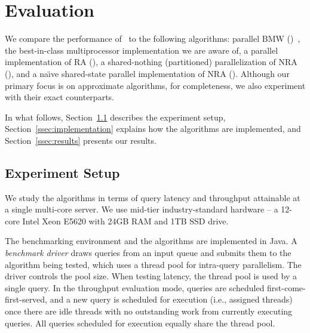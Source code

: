 \section{Evaluation} \label{sec:eval}

We compare the performance of \alg\ to the following algorithms: parallel BMW (\pBMW)~\cite{rojas2013efficient}, 
the best-in-class multiprocessor implementation we are aware of, a parallel implementation of RA (\pRA),  a shared-nothing (partitioned) parallelization of NRA (\sNRA), and a
na\"{\i}ve shared-state parallel implementation of NRA (\pNRA). 
Although our primary focus is on  approximate 
algorithms, for completeness, we also experiment with their exact counterparts.
%

In what follows, Section~\ref{ssec:setup} describes the experiment setup, 
Section~\ref{ssec:implementation} explains how the algorithms are 
implemented, and Section~\ref{ssec:results} presents our results.


\subsection{Experiment Setup}
\label{ssec:setup}

We study the algorithms in terms of query latency and throughput attainable at a single multi-core server. 
We use mid-tier industry-standard hardware -- a 12-core Intel Xeon E5620 with 24GB RAM and 1TB SSD drive. 


The benchmarking environment and the algorithms  are implemented in Java. 
A  \emph{benchmark driver} draws queries from an input queue and submits them to the algorithm being tested, which
uses a thread pool for intra-query parallelism. 
The driver controls the pool size. %
When testing latency, the thread pool is used by a single query. 
In the throughput evaluation mode, queries are scheduled first-come-first-served, 
and a new query is scheduled for execution (i.e., assigned threads) 
once  there are idle threads with no outstanding work from currently executing queries.
All queries scheduled for execution equally share the thread pool.

